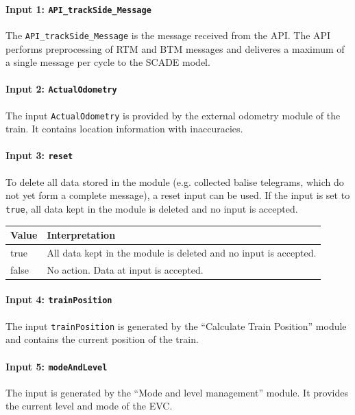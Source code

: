 \paragraph{Input 1: \texttt{API\_trackSide\_Message}}
The \texttt{API\_trackSide\_Message} is the message received from the API. The API performs preprocessing of RTM and BTM messages and deliveres a maximum of a single message per cycle to the SCADE model.

\paragraph{Input 2: \texttt{ActualOdometry}}
The input \texttt{ActualOdometry} is provided by the external odometry module of the train. It contains location information with inaccuracies.

\paragraph{Input 3: \texttt{reset}}
To delete all data stored in the module (e.g. collected balise telegrams, which do not yet form a complete message), a reset input can be used. If the input is set to \texttt{true}, all data kept in the module is deleted and no input is accepted.

\begin{minipage}{\linewidth}
   \begin{tabular}{| l | p{9cm} |}
    \hline
    \textbf{Value} & \textbf{Interpretation}\\ \hline
    true & All data kept in the module is deleted and no input is accepted.\\
    false & No action. Data at input is accepted.\\
    \hline
  \end{tabular} 
  \label{tbl:reset}
\end{minipage}


\paragraph{Input 4: \texttt{trainPosition}}
The input \texttt{trainPosition} is generated by the ``Calculate Train Position'' module and contains the current position of the train.

\paragraph{Input 5: \texttt{modeAndLevel}}
The input is generated by the ``Mode and level management'' module. It provides the current level and mode of the EVC.

